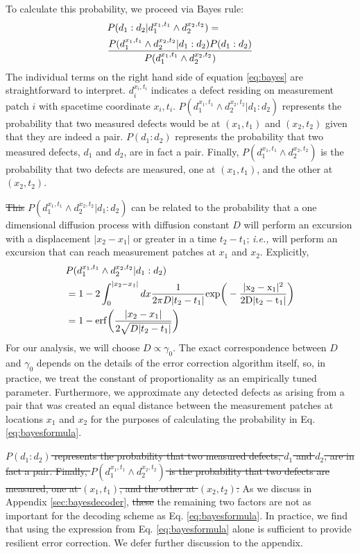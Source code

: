 \documentclass[twocolumn,superscriptaddress,aps,prb,floatfix]{revtex4-1}
\newcommand{\CMH}[1]{{\color{green} { #1}}}
\begin{document}
To calculate this probability, we proceed via Bayes rule: 
\begin{align}
\label{eq:bayes}
&P(d_1:d_2 | d_1^{x_1,t_1} \wedge d_2^{x_2,t_2}) = \\ \notag
&\frac{P(d_1^{x_1,t_1} \wedge d_2^{x_2,t_2} | d_1:d_2) P(d_1 : d_2)}{P(d_1^{x_1,t_1}\wedge d_2^{x_2,t_2})}
\end{align}
The individual terms on the right hand side of equation \ref{eq:bayes} are straightforward to interpret.  $d_i^{x_i,t_i}$ indicates a defect residing on measurement patch $i$ with spacetime coordinate $x_i,t_i$.  $P(d_1^{x_1,t_1} \wedge d_2^{x_2,t_2} | d_1:d_2)$ represents the probability that two measured defects would be at $(x_1,t_1)$ and $(x_2,t_2)$ given that they are indeed a pair. \CMH{$P(d_1 : d_2)$ represents the probability that two measured defects, $d_1$ and $d_2$, are in fact a pair.  Finally, $P(d_1^{x_1,t_1}\wedge d_2^{x_2,t_2})$ is the probability that two defects are measured, one at $(x_1,t_1)$, and the other at $(x_2,t_2)$. }


\CMH{\sout{This} $P(d_1^{x_1,t_1} \wedge d_2^{x_2,t_2} | d_1:d_2)$} can be related to the probability that a one dimensional diffusion process with diffusion constant $D$ will perform an excursion with a displacement $|x_2-x_1|$ or greater in a time $t_2 - t_1$; \textit{i.e.,} will perform an excursion that can reach measurement patches at $x_1$ and $x_2$. Explicitly,
\begin{align}
\label{eq:bayesformula}
&P(d_1^{x_1,t_1} \wedge d_2^{x_2,t_2} | d_1:d_2) \\ \notag
&= 1-2\int_{0}^{|x_2-x_1|} dx \frac{1}{2\pi D |t_2-t_1|} \rm{exp}\bigg(-\frac{|x_2-x_1|^2}{2 D |t_2-t_1|}\bigg) \\ \notag 
&= 1 - {\rm erf}\bigg(\frac{|x_2-x_1|}{2\sqrt{D |t_2 - t_1|}}\bigg) 
\end{align}
For our analysis, we will choose $D\propto \gamma_0$.  The exact correspondence between $D$ and $\gamma_0$ depends on the details of the error correction algorithm itself, so, in practice, we treat the constant of proportionality as an empirically tuned parameter.  Furthermore, we approximate any detected defects as arising from a pair that was created an equal distance between the measurement patches at locations $x_1$ and $x_2$ for the purposes of calculating the probability in Eq. \ref{eq:bayesformula}.

\CMH{\sout{$P(d_1 : d_2)$ represents the probability that two measured defects, $d_1$ and $d_2$, are in fact a pair.  Finally, $P(d_1^{x_1,t_1}\wedge d_2^{x_2,t_2})$ is the probability that two defects are measured, one at $(x_1,t_1)$, and the other at $(x_2,t_2)$.}}  As we discuss in Appendix \ref{sec:bayesdecoder}, \CMH{\sout{these} the remaining two} factors are not as important for the decoding scheme as Eq. \ref{eq:bayesformula}.  In practice, we find that using the expression from Eq. \ref{eq:bayesformula} alone is sufficient to provide resilient error correction.  We defer further discussion to the appendix.
 
\end{document}
